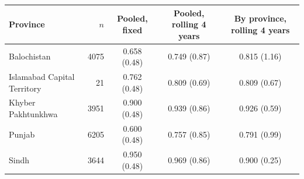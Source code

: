 \begin{tabular}{lrccc}
\toprule
Province & $n$ & Pooled, fixed & Pooled, rolling 4 years & By province, rolling 4 years \\
\midrule
Balochistan & 4075 & 0.658 (0.48) & 0.749 (0.87) & 0.815 (1.16) \\
Islamabad Capital Territory & 21 & 0.762 (0.48) & 0.809 (0.69) & 0.809 (0.67) \\
Khyber Pakhtunkhwa & 3951 & 0.900 (0.48) & 0.939 (0.86) & 0.926 (0.59) \\
Punjab & 6205 & 0.600 (0.48) & 0.757 (0.85) & 0.791 (0.99) \\
Sindh & 3644 & 0.950 (0.48) & 0.969 (0.86) & 0.900 (0.25) \\
\bottomrule
\end{tabular}
